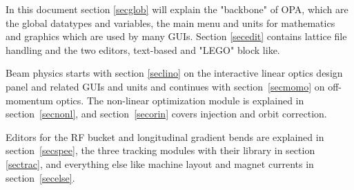 \documentclass[12pt]{article}
\begin{document}
In this document section \ref{secglob} will explain the "backbone" of OPA, which are the global datatypes and variables, the main menu and units for mathematics and graphics which are used by many GUIs. 
Section \ref{secedit} contains lattice file handling and the two editors, text-based and "LEGO" block like.

Beam physics starts with section \ref{seclino} on the interactive linear optics design panel and related GUIs and units and continues with section~\ref{secmomo} on off-momentum optics. The non-linear optimization module is explained in section~\ref{secnonl}, and section~\ref{secorin} covers injection and orbit correction.

Editors for the RF bucket and longitudinal gradient bends are explained in section~\ref{secspee}, the three tracking modules with their library in section \ref{sectrac}, and everything else like machine layout and magnet currents in section~\ref{secelse}.
\end{document}
